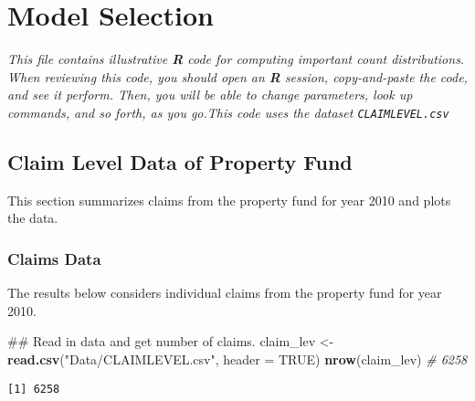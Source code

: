 \documentclass[]{book}
\newenvironment{Shaded}{\begin{snugshade}}{\end{snugshade}}
\newcommand{\KeywordTok}[1]{\textcolor[rgb]{0.13,0.29,0.53}{\textbf{#1}}}
\newcommand{\DataTypeTok}[1]{\textcolor[rgb]{0.13,0.29,0.53}{#1}}
\newcommand{\DecValTok}[1]{\textcolor[rgb]{0.00,0.00,0.81}{#1}}
\newcommand{\StringTok}[1]{\textcolor[rgb]{0.31,0.60,0.02}{#1}}
\newcommand{\CommentTok}[1]{\textcolor[rgb]{0.56,0.35,0.01}{\textit{#1}}}
\newcommand{\OtherTok}[1]{\textcolor[rgb]{0.56,0.35,0.01}{#1}}
\newcommand{\OperatorTok}[1]{\textcolor[rgb]{0.81,0.36,0.00}{\textbf{#1}}}
\newcommand{\NormalTok}[1]{#1}
\theoremstyle{definition}
\theoremstyle{definition}
\theoremstyle{definition}
\theoremstyle{remark}
\begin{document}
\chapter{Model Selection}\label{model-selection}

\emph{This file contains illustrative \textbf{R} code for computing
important count distributions. When reviewing this code, you should open
an \textbf{R} session, copy-and-paste the code, and see it perform.
Then, you will be able to change parameters, look up commands, and so
forth, as you go.This code uses the dataset \texttt{CLAIMLEVEL.csv} }

\section{Claim Level Data of Property
Fund}\label{claim-level-data-of-property-fund}

This section summarizes claims from the property fund for year 2010 and
plots the data.

\subsection{Claims Data}\label{claims-data}

The results below considers individual claims from the property fund for
year 2010.

\begin{Shaded}
\begin{Highlighting}[]
\NormalTok{## Read in data and get number of claims.  }
\NormalTok{claim_lev <-}\StringTok{ }\KeywordTok{read.csv}\NormalTok{(}\StringTok{"Data/CLAIMLEVEL.csv"}\NormalTok{, }\DataTypeTok{header =} \OtherTok{TRUE}\NormalTok{) }
\KeywordTok{nrow}\NormalTok{(claim_lev)  }\CommentTok{# 6258}
\end{Highlighting}
\end{Shaded}

\begin{verbatim}
[1] 6258
\end{verbatim}

\begin{Shaded}
\end{Shaded}
\end{document}
